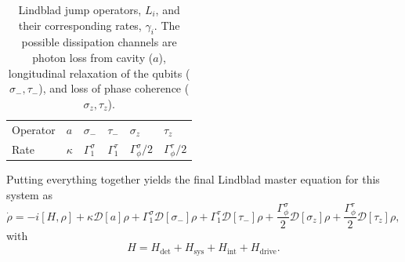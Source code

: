 \begin{table}[t]
    \centering
    \begin{tabular}{llllll}
        \toprule
        Operator & $a$ & $\sigma_-$ & $\tau_-$ & $\sigma_z$ & $\tau_z$\\
        Rate & $\kappa$ & $\Gamma_1^\sigma$ & $\Gamma_1^\tau$ & $\Gamma_\phi^\sigma/2$ & $\Gamma_\phi^\tau/2$\\
        \bottomrule
    \end{tabular}
    \caption{Lindblad jump operators, $L_i$, and their corresponding rates, $\gamma_i$. The possible dissipation channels are photon loss from cavity ($a$), longitudinal relaxation of the qubits ($\sigma_-, \tau_-$), and loss of phase coherence ($\sigma_z, \tau_z$).}
    \label{tab:dissipationRates}
\end{table}

Putting everything together yields the final Lindblad master equation for this system as
\begin{equation}
    \dot{\rho} = - i[H, \rho] + \kappa \mathcal{D}[a]\rho + \Gamma_1^\sigma\mathcal{D}[\sigma_-]\rho + \Gamma_1^\tau\mathcal{D}[\tau_-]\rho + \frac{\Gamma_\phi^\sigma}{2}\mathcal{D}[\sigma_z]\rho + \frac{\Gamma_\phi^\tau}{2}\mathcal{D}[\tau_z]\rho,
\end{equation}
with
\begin{equation}
    H = H_\text{det} + H_\mathrm{sys} + H_\mathrm{int} + H_\text{drive}.
\end{equation}

